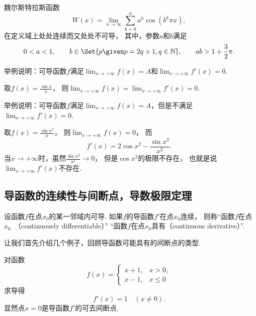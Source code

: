 \begin{example}
魏尔斯特拉斯函数\[
	W(x) = \lim_{n\to\infty} \sum_{k=0}^n a^k \cos(b^k \pi x),
\]在定义域上处处连续而又处处不可导，
其中，参数\(a\)和\(b\)满足\[
	0<a<1,
	\qquad
	b\in\Set{ p \given p = 2q+1, q\in\mathbb{N} },
	\qquad
	ab > 1+\frac{3}{2}\pi.
\]
\end{example}

\begin{example}
举例说明：可导函数\(f\)满足\(\lim_{x\to+\infty} f(x) = A\)和\(\lim_{x\to+\infty} f'(x) = 0\).
\begin{solution}
取\(f(x) = \frac{\sin x}{x}\)，
则\(\lim_{x\to+\infty} f(x) = \lim_{x\to+\infty} f'(x) = 0\).
\end{solution}
\end{example}
\begin{example}
举例说明：可导函数\(f\)满足\(\lim_{x\to+\infty} f(x) = A\)，但是不满足\(\lim_{x\to+\infty} f'(x) = 0\).
\begin{solution}
取\(f(x) = \frac{\sin x^2}{x}\)，
则\(\lim_{x\to+\infty} f(x) = 0\)，
而\[
	f'(x) = 2 \cos x^2 - \frac{\sin x^2}{x^2}.
\]
当\(x\to+\infty\)时，虽然\(\frac{\sin x^2}{x^2} \to 0\)，
但是\(\cos x^2\)的极限不存在，
也就是说\(\lim_{x\to+\infty} f'(x)\)不存在.
\end{solution}
\end{example}

\subsection{导函数的连续性与间断点，导数极限定理}
\begin{definition}
设函数\(f\)在点\(x_0\)的某一邻域内可导.
如果\(f\)的导函数\(f'\)在点\(x_0\)连续，
则称“函数\(f\)在点\(x_0\)~（continuously differentiable）”
“函数\(f\)在点\(x_0\)具有（continuous derivative）”.
\end{definition}

让我们首先介绍几个例子，回顾导函数可能具有的间断点的类型.

\begin{example}
对函数\[
	f(x) = \left\{ \begin{array}{cl}
		x+1, & x>0, \\
		x-1, & x\leq0
	\end{array} \right.
\]求导得\[
	f'(x) = 1
	\quad(x\neq0).
\]
显然点\(x=0\)是导函数\(f'\)的可去间断点.
\end{example}

